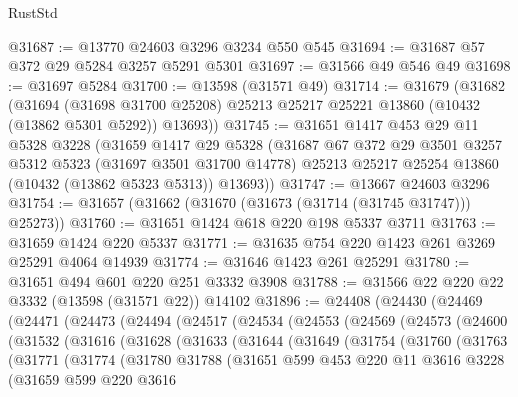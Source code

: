 \begin{lexlean}{RustStd}
\begin{coremodule}
@31687 := @13770 @24603 @3296 @3234 @550 @545
@31694 := @31687 @57 @372 @29 @5284 @3257 @5291 @5301
@31697 := @31566 @49 @546 @49
@31698 := @31697 @5284
@31700 := @13598 (@31571 @49)
@31714 := @31679
    (@31682
      (@31694
        (@31698 @31700 @25208)
        @25213
        @25217
        @25221
        @13860
        (@10432 (@13862 @5301 @5292))
        @13693))
@31745 := @31651
    @1417
    @453
    @29
    @11
    @5328
    @3228
    (@31659
      @1417
      @29
      @5328
      (@31687
        @67
        @372
        @29
        @3501
        @3257
        @5312
        @5323
        (@31697 @3501 @31700 @14778)
        @25213
        @25217
        @25254
        @13860
        (@10432 (@13862 @5323 @5313))
        @13693))
@31747 := @13667 @24603 @3296
@31754 := @31657 (@31662 (@31670 (@31673 (@31714 (@31745 @31747))) @25273))
@31760 := @31651 @1424 @618 @220 @198 @5337 @3711
@31763 := @31659 @1424 @220 @5337
@31771 := @31635 @754 @220 @1423 @261 @3269 @25291 @4064 @14939
@31774 := @31646 @1423 @261 @25291
@31780 := @31651 @494 @601 @220 @251 @3332 @3908
@31788 := @31566 @22 @220 @22 @3332 (@13598 (@31571 @22)) @14102
@31896 := @24408
    (@24430
      (@24469
        (@24471
          (@24473
            (@24494
              (@24517
                (@24534
                  (@24553
                    (@24569
                      (@24573
                        (@24600
                          (@31532
                            (@31616
                              (@31628
                                (@31633
                                  (@31644
                                    (@31649
                                      (@31754
                                        (@31760
                                          (@31763
                                            (@31771
                                              (@31774
                                                (@31780
                                                  @31788
                                                  (@31651
                                                    @599
                                                    @453
                                                    @220
                                                    @11
                                                    @3616
                                                    @3228
                                                    (@31659
                                                      @599
                                                      @220
                                                      @3616

\end{coremodule}
\end{lexlean}
